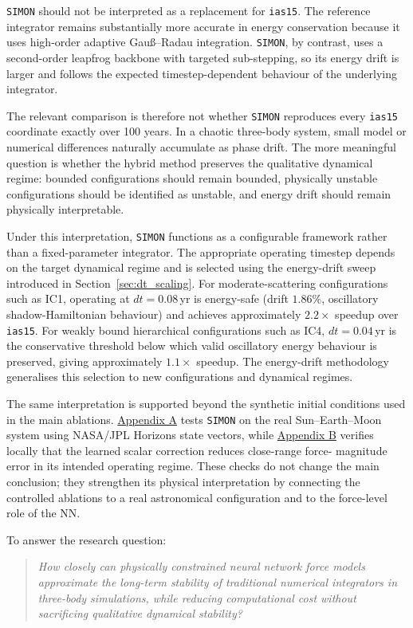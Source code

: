 \documentclass[12pt]{article}
\begin{document}
\texttt{SIMON} should not be interpreted as a replacement for \texttt{ias15}. The reference
integrator remains substantially more accurate in energy conservation because it uses
high-order adaptive Gau\ss--Radau integration. \texttt{SIMON}, by contrast, uses a
second-order leapfrog backbone with targeted sub-stepping, so its energy drift is larger
and follows the expected timestep-dependent behaviour of the underlying integrator.

The relevant comparison is therefore not whether \texttt{SIMON} reproduces every
\texttt{ias15} coordinate exactly over 100 years. In a chaotic three-body system, small
model or numerical differences naturally accumulate as phase drift. The more meaningful
question is whether the hybrid method preserves the qualitative dynamical regime:
bounded configurations should remain bounded, physically unstable configurations should
be identified as unstable, and energy drift should remain physically interpretable.

Under this interpretation, \texttt{SIMON} functions as a configurable
framework rather than a fixed-parameter integrator. The appropriate operating
timestep depends on the target dynamical regime and is selected using the
energy-drift sweep introduced in Section~\ref{sec:dt_scaling}. For
moderate-scattering configurations such as IC1, operating at $dt=0.08$\,yr
is energy-safe (drift $1.86\%$, oscillatory shadow-Hamiltonian behaviour)
and achieves approximately $2.2\times$ speedup over \texttt{ias15}. For
weakly bound hierarchical configurations such as IC4, $dt=0.04$\,yr is the
conservative threshold below which valid oscillatory energy behaviour is
preserved, giving approximately $1.1\times$ speedup. The energy-drift
methodology generalises this selection to new configurations and dynamical
regimes.

The same interpretation is supported beyond the synthetic initial conditions used in the main ablations. \hyperref[app:real_system_validation]{Appendix A} tests \texttt{SIMON}
on the real Sun--Earth--Moon system using NASA/JPL Horizons
state vectors, while
\hyperref[app:force_level_nn_validation]{Appendix B} verifies locally
that the learned scalar correction reduces close-range force-
magnitude error in its intended operating regime. These checks do not change the main conclusion; they strengthen its physical interpretation by connecting the controlled ablations to a real astronomical configuration and to the force-level role of the NN.

To answer the research question:
\begin{quote}
\emph{How closely can physically constrained neural network force models approximate the
long-term stability of traditional numerical integrators in three-body simulations, while
reducing computational cost without sacrificing qualitative dynamical stability?}
\end{quote}
\end{document}
